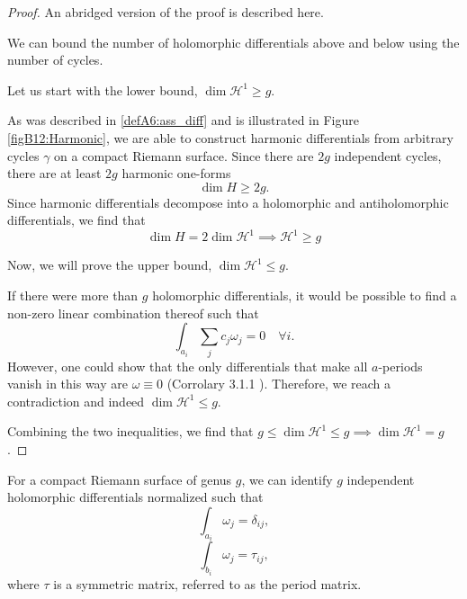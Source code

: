 \begin{proof}
    An abridged version of the proof is described here.

    We can bound the number of holomorphic differentials above and below using the number of cycles.

    Let us start with the lower bound, $\dim \mathcal H^1 \geq g$.

    As was described in \ref{defA6:ass_diff} and is illustrated in Figure \ref{figB12:Harmonic}, we are able to construct harmonic differentials from arbitrary cycles $\gamma$ on a compact Riemann surface. Since there are $2g$ independent cycles, there are at least $2g$ harmonic one-forms
    \begin{equation}
        \dim H \geq 2g.
    \end{equation}
    Since harmonic differentials decompose into a holomorphic and antiholomorphic differentials, we find that
    \begin{equation}
        \dim H = 2 \dim \mathcal H^1 \implies \mathcal H^1 \geq g
    \end{equation}

    Now, we will prove the upper bound, $\dim \mathcal H^1 \leq g$.

    If there were more than $g$ holomorphic differentials, it would be possible to find a non-zero linear combination thereof such that
    \begin{equation}
        \int_{a_i} \sum_j c_j \omega_j = 0 \quad \forall i.
    \end{equation}
    However, one could show that the only differentials that make all $a$-periods vanish in this way are $\omega \equiv 0$ (Corrolary 3.1.1 \cite{Ber06}). Therefore, we reach a contradiction and indeed $\dim \mathcal H^1 \leq g$. 

    Combining the two inequalities, we find that $g \leq \dim \mathcal H^1 \leq g \implies \dim \mathcal H^1 = g$.
\end{proof}

\begin{lemma}
    For a compact Riemann surface of genus $g$, we can identify $g$ independent holomorphic differentials normalized such that
    \begin{equation}
        \int_{a_i} \omega_j = \delta_{ij},
    \end{equation}
    \begin{equation}
        \int_{b_i} \omega_j = \tau_{ij},
    \end{equation}
    where $\tau$ is a symmetric matrix, referred to as the period matrix.
\end{lemma}

